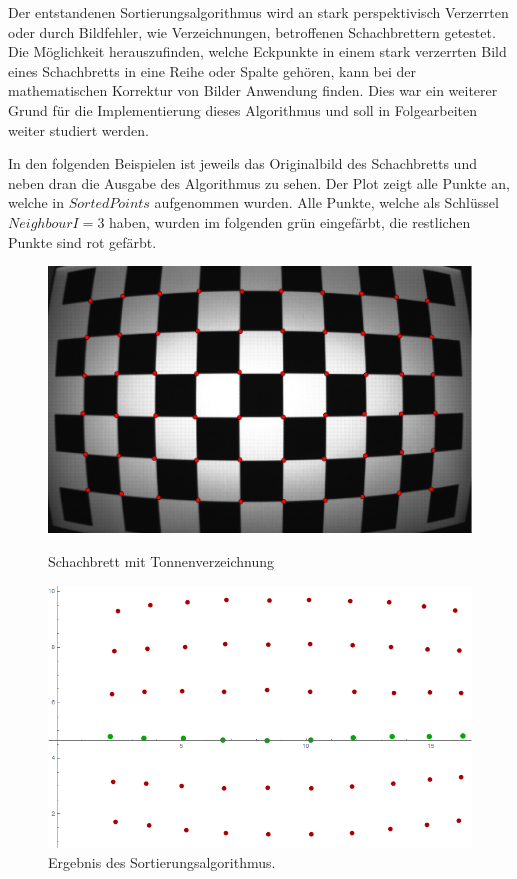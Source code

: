 Der entstandenen Sortierungsalgorithmus wird an stark perspektivisch Verzerrten oder durch Bildfehler, wie Verzeichnungen, betroffenen Schachbrettern getestet. Die Möglichkeit herauszufinden, welche Eckpunkte in einem stark verzerrten Bild eines Schachbretts in eine Reihe oder Spalte gehören, kann bei der mathematischen Korrektur von Bilder Anwendung finden. Dies war ein weiterer Grund für die Implementierung dieses Algorithmus und soll in Folgearbeiten weiter studiert werden. 


In den folgenden Beispielen ist jeweils das Originalbild des Schachbretts und neben dran die Ausgabe des Algorithmus zu sehen. Der Plot zeigt alle Punkte an, welche in $SortedPoints$ aufgenommen wurden. Alle Punkte, welche als Schlüssel $NeighbourI = 3$ haben, wurden im folgenden grün eingefärbt, die restlichen Punkte sind rot gefärbt.


\begin{figure}[!htb]
	\includegraphics[width=\linewidth]{images/Tonnenverzeichnung.png}
	\caption[Schachbrett mit Tonnenverzeichnung]{Schachbrett mit Tonnenverzeichnung}
	\label{fig:Extreme1}
	\endminipage\hfill
	\includegraphics[width=\linewidth]{images/AlgTonnenverzeichnung.png}
	\caption[Sortierte Punkte eines Schachbretts mit Tonnenverzeichnung]{Ergebnis des Sortierungsalgorithmus.}
	\label{fig:Extreme2}
	\endminipage\hfill
\end{figure}

